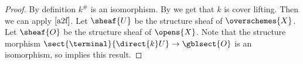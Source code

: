 \begin{proof}
By definition $k^{\#}$ is an isomorphism.
By  we get that $k$ is cover lifting.
Then we can apply $\Cref{a2f}$.
Let $\sheaf{U}$ be the structure sheaf of $\overschemes{X}$.
Let $\sheaf{O}$ be the structure sheaf of $\opens{X}$.
Note that the structure morphism $\sect{\terminal}{\direct{k}U} \rightarrow \gblsect{O}$
is an isomorphism, so  implies this result.
\end{proof}